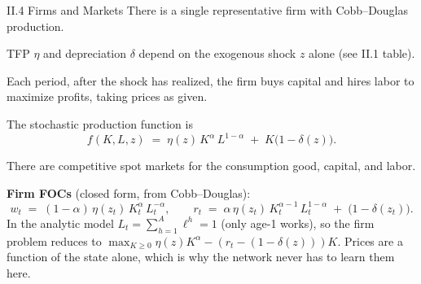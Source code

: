 \documentclass[aspectratio=169,11pt]{beamer}
\newcommand{\emphc}[1]{\textcolor{harvardcrimson}{#1}}
\begin{document}
\begin{frame}{II.4 Firms and Markets}
\small
There is a single representative firm with \emphc{Cobb--Douglas} production.

\vspace{0.3em}
TFP $\eta$ and depreciation $\delta$ depend on the exogenous shock $z$ alone (see II.1 table).

\vspace{0.3em}
Each period, \emphc{after the shock has realized}, the firm buys capital and hires labor to maximize profits, taking prices as given.

\vspace{0.4em}
The stochastic production function is
\[
f(K, L, z) \;=\; \eta(z)\, K^\alpha\, L^{1-\alpha} \;+\; K\bigl(1-\delta(z)\bigr).
\]

\vspace{0.4em}
There are \emphc{competitive spot markets} for the consumption good, capital, and labor.

\vspace{0.4em}
\textbf{Firm FOCs} (closed form, from Cobb--Douglas):
\[
w_t \;=\; (1-\alpha)\,\eta(z_t)\, K_t^{\alpha}\, L_t^{-\alpha}, \qquad
r_t \;=\; \alpha\,\eta(z_t)\, K_t^{\alpha-1}\, L_t^{1-\alpha} \;+\; \bigl(1-\delta(z_t)\bigr).
\]
{\footnotesize In the analytic model $L_t = \sum_{h=1}^A \ell^h = 1$ (only age-1 works), so the firm problem reduces to $\max_{K \ge 0} \eta(z) K^\alpha - (r_t - (1-\delta(z))) K$.  \emphc{Prices are a function of the state alone}, which is why the network never has to learn them here.}
\end{frame}
\end{document}
